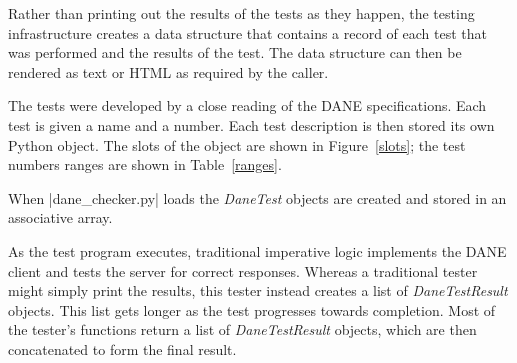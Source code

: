 \documentclass[preprint,3p]{elsarticle}
\begin{document}
Rather than printing out the results of the tests as they happen, the
testing infrastructure creates a data structure that contains a record
of each test that was performed and the results of the test. The
data structure can then be rendered as text or HTML as required by the
caller. 

The tests were developed by a
close reading of the DANE specifications. Each test is given a name
and a number. Each test description is then stored its own Python
object. The slots of the object are shown in Figure~\ref{slots}; the
test numbers ranges are shown in Table~\ref{ranges}.
\begin{table}
\centering{}
\caption{Slots in the DaneTest object}\label{slots}
\end{table}

\begin{table}
\centering{}
\caption{Test numbers for DANE tests}\label{ranges}
\end{table}

When |dane_checker.py| loads the \emph{DaneTest} objects are created
and stored in an associative array.

As the test program executes, traditional imperative logic implements
the DANE client and tests the server for correct responses. Whereas a
traditional tester might simply print the results, this tester instead
creates a list of \emph{DaneTestResult} objects. This list gets longer
as the test progresses towards completion. Most of the tester's
functions return a list of \emph{DaneTestResult} objects, which are
then concatenated to form the final result.
\end{document}
